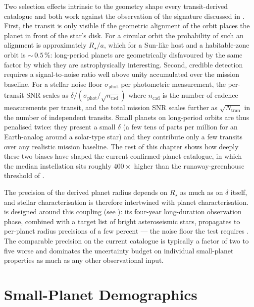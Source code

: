 Two selection effects intrinsic to the geometry shape every
transit-derived catalogue and both work against the observation of
the \HZIED signature discussed in .  First,
the transit is only visible if the geometric alignment of the orbit
places the planet in front of the star's disk.  For a circular orbit
the probability of such an alignment is approximately $R_\star / a$,
which for a Sun-like host and a habitable-zone orbit is
${\sim}\,0.5\,\%$: long-period planets are geometrically disfavoured
by the same factor by which they are astrophysically interesting.
Second, credible detection requires a signal-to-noise ratio well
above unity accumulated over the mission baseline.  For a stellar
noise floor $\sigma_\mathrm{phot}$ per photometric measurement, the
per-transit SNR scales as
$\delta/(\sigma_\mathrm{phot}/\sqrt{n_\mathrm{cad}})$ where
$n_\mathrm{cad}$ is the number of cadence measurements per transit,
and the total mission SNR scales further as $\sqrt{N_\mathrm{tran}}$
in the number of independent transits.  Small planets on long-period
orbits are thus penalised twice: they present a small $\delta$ (a few
tens of parts per million for an Earth-analog around a solar-type
star) and they contribute only a few transits over any realistic
mission baseline.  The rest of this chapter shows how deeply these
two biases have shaped the current confirmed-planet catalogue, in
which the median instellation sits roughly $400\times$ higher than
the runaway-greenhouse threshold of .

The precision of the derived planet radius depends on $R_\star$ as
much as on $\delta$ itself, and stellar characterisation is therefore
intertwined with planet characterisation.  \PLATO is designed around
this coupling (see ): its four-year
long-duration observation phase, combined with a target list of
bright asteroseismic stars, propagates to per-planet radius precisions
of a few percent --- the noise floor the \HZIED test requires
\parencite{Schlecker2024}.  The comparable precision on the current
\Kepler catalogue is typically a factor of two to five worse
\parencite{Bryson2021} and dominates the uncertainty budget on
individual small-planet properties as much as any other observational
input.


\section{Small-Planet Demographics}
\label{sec:small_planet_demographics}

